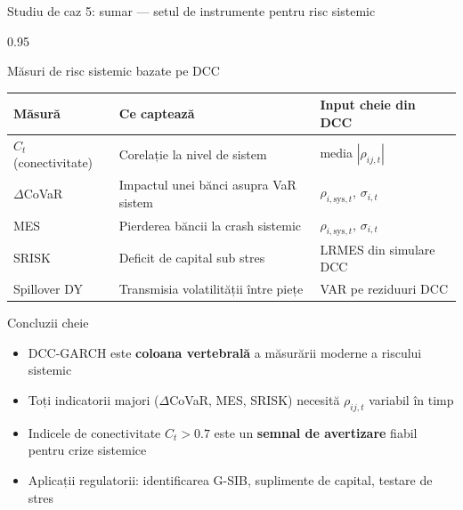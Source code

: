 \documentclass[9pt, aspectratio=169, t]{beamer}
\begin{document}
\begin{frame}{Studiu de caz 5: sumar --- setul de instrumente pentru risc sistemic}
    \begin{cminipage}{0.95\textwidth}
    {\footnotesize
    \begin{block}{Măsuri de risc sistemic bazate pe DCC}
        \vspace{0.1cm}
        {\small
        \begin{center}
        \begin{tabular}{l|l|l}
            \hline
            \textbf{Măsură} & \textbf{Ce captează} & \textbf{Input cheie din DCC} \\
            \hline
            $C_t$ (conectivitate) & Corelație la nivel de sistem & media $|\rho_{ij,t}|$ \\
            $\Delta$CoVaR         & Impactul unei bănci asupra VaR sistem & $\rho_{i,\text{sys},t}$, $\sigma_{i,t}$ \\
            MES                   & Pierderea băncii la crash sistemic & $\rho_{i,\text{sys},t}$, $\sigma_{i,t}$ \\
            SRISK                 & Deficit de capital sub stres & LRMES din simulare DCC \\
            Spillover DY          & Transmisia volatilității între piețe & VAR pe reziduuri DCC \\
            \hline
        \end{tabular}
        \end{center}
        }
    \end{block}
    \begin{alertblock}{Concluzii cheie}
        \begin{itemize}\setlength{\itemsep}{0pt}
            \item DCC-GARCH este \textbf{coloana vertebrală} a măsurării moderne a riscului sistemic
            \item Toți indicatorii majori ($\Delta$CoVaR, MES, SRISK) necesită $\rho_{ij,t}$ variabil în timp
            \item Indicele de conectivitate $C_t > 0.7$ este un \textbf{semnal de avertizare} fiabil pentru crize sistemice
            \item Aplicații regulatorii: identificarea G-SIB, suplimente de capital, testare de stres
        \end{itemize}
    \end{alertblock}
    }
    \end{cminipage}
\end{frame}
\end{document}
